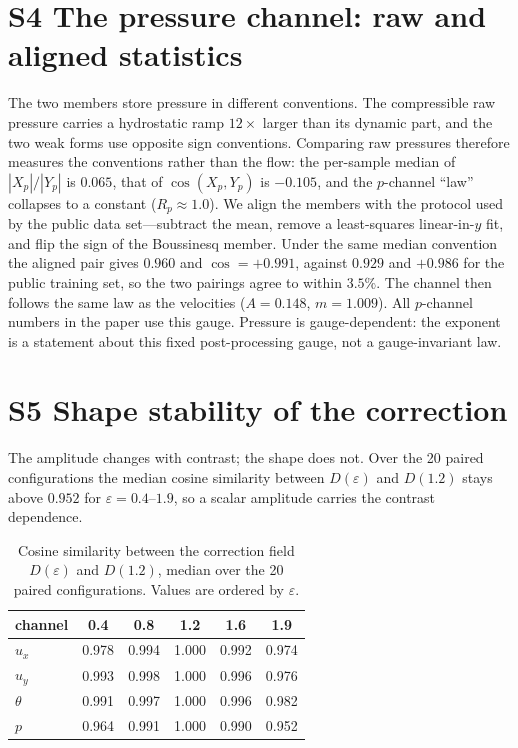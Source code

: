\documentclass[preprint,11pt,a4paper,times]{elsarticle}
\begin{document}
\section*{S4 The pressure channel: raw and aligned statistics}
\label{sec:pressure-supp}

The two members store pressure in different conventions. The compressible raw pressure carries a
hydrostatic ramp $12\times$ larger than its dynamic part, and the two weak forms use opposite
sign conventions. Comparing raw pressures therefore measures the conventions rather than the flow:
the per-sample median of $|X_p|/|Y_p|$ is $0.065$, that of $\cos(X_p,Y_p)$ is $-0.105$, and the
$p$-channel ``law'' collapses to a constant ($R_p\approx1.0$). We align the members with the
protocol used by the public data set---subtract the mean, remove a least-squares linear-in-$y$ fit,
and flip the sign of the Boussinesq member. Under the same median convention the aligned pair gives
$0.960$ and $\cos=+0.991$, against $0.929$ and $+0.986$ for the public training set, so the two
pairings agree to within $3.5\%$. The channel then follows the same law as the velocities
($A=0.148$, $m=1.009$). All $p$-channel numbers in the paper use this gauge. Pressure is
gauge-dependent: the exponent is a statement about this fixed post-processing gauge, not a
gauge-invariant law.

\section*{S5 Shape stability of the correction}
The amplitude changes with contrast; the shape does not. Over the 20 paired configurations the
median cosine similarity between $D(\varepsilon)$ and $D(1.2)$ stays above $0.952$ for
$\varepsilon=0.4$--$1.9$, so a scalar amplitude carries the contrast dependence.

\begin{table}[htbp]
\centering
\small
\caption{Cosine similarity between the correction field $D(\varepsilon)$ and $D(1.2)$, median
over the 20 paired configurations. Values are ordered by $\varepsilon$.}
\label{tab:shape}
\begin{tabular}{@{}lccccc@{}}
\toprule
channel & 0.4 & 0.8 & 1.2 & 1.6 & 1.9\\
\midrule
$u_x$ & 0.978 & 0.994 & 1.000 & 0.992 & 0.974\\
$u_y$ & 0.993 & 0.998 & 1.000 & 0.996 & 0.976\\
$\theta$ & 0.991 & 0.997 & 1.000 & 0.996 & 0.982\\
$p$ & 0.964 & 0.991 & 1.000 & 0.990 & 0.952\\
\bottomrule
\end{tabular}
\end{table}
\end{document}
